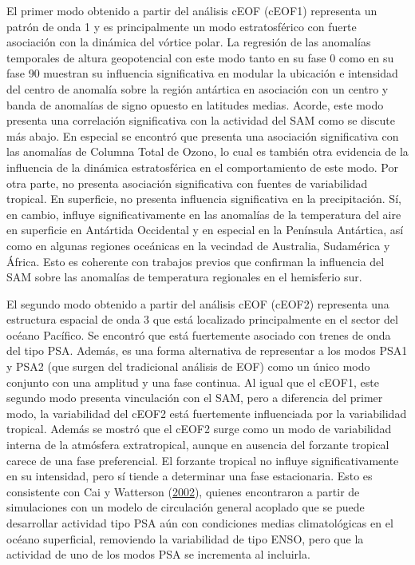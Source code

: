 \documentclass[12pt,oneside,a4paper]{reedthesis}
\begin{document}
El primer modo obtenido a partir del análisis cEOF (cEOF1) representa un patrón de onda 1 y es principalmente un modo estratosférico con fuerte asociación con la dinámica del vórtice polar.
La regresión de las anomalías temporales de altura geopotencial con este modo tanto en su fase 0 como en su fase 90 muestran su influencia significativa en modular la ubicación e intensidad del centro de anomalía sobre la región antártica en asociación con un centro y banda de anomalías de signo opuesto en latitudes medias.
Acorde, este modo presenta una correlación significativa con la actividad del SAM como se discute más abajo.
En especial se encontró que presenta una asociación significativa con las anomalías de Columna Total de Ozono, lo cual es también otra evidencia de la influencia de la dinámica estratosférica en el comportamiento de este modo.
Por otra parte, no presenta asociación significativa con fuentes de variabilidad tropical.
En superficie, no presenta influencia significativa en la precipitación.
Sí, en cambio, influye significativamente en las anomalías de la temperatura del aire en superficie en Antártida Occidental y en especial en la Península Antártica, así como en algunas regiones oceánicas en la vecindad de Australia, Sudamérica y África.
Esto es coherente con trabajos previos que confirman la influencia del SAM sobre las anomalías de temperatura regionales en el hemisferio sur.

El segundo modo obtenido a partir del análisis cEOF (cEOF2) representa una estructura espacial de onda 3 que está localizado principalmente en el sector del océano Pacífico.
Se encontró que está fuertemente asociado con trenes de onda del tipo PSA.
Además, es una forma alternativa de representar a los modos PSA1 y PSA2 (que surgen del tradicional análisis de EOF) como un único modo conjunto con una amplitud y una fase continua.
Al igual que el cEOF1, este segundo modo presenta vinculación con el SAM, pero a diferencia del primer modo, la variabilidad del cEOF2 está fuertemente influenciada por la variabilidad tropical.
Además se mostró que el cEOF2 surge como un modo de variabilidad interna de la atmósfera extratropical, aunque en ausencia del forzante tropical carece de una fase preferencial.
El forzante tropical no influye significativamente en su intensidad, pero sí tiende a determinar una fase estacionaria.
Esto es consistente con Cai y Watterson (\protect\hyperlink{ref-cai2002}{2002}), quienes encontraron a partir de simulaciones con un modelo de circulación general acoplado que se puede desarrollar actividad tipo PSA aún con condiciones medias climatológicas en el océano superficial, removiendo la variabilidad de tipo ENSO, pero que la actividad de uno de los modos PSA se incrementa al incluirla.
\end{document}
